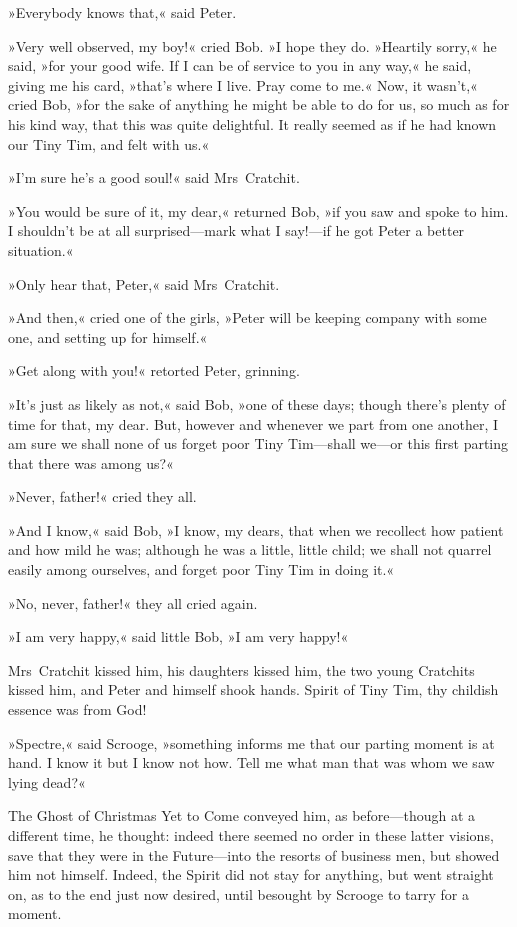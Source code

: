 »Everybody knows that,« said Peter.

»Very well observed, my boy!« cried Bob. »I hope they do. »Heartily sorry,« he said, »for your good wife. If I can be of service to you in any way,« he said, giving me his card, »that's where I live. Pray come to me.« Now, it wasn't,« cried Bob, »for the sake of anything he might be able to do for us, so much as for his kind way, that this was quite delightful. It really seemed as if he had known our Tiny Tim, and felt with us.«

»I'm sure he's a good soul!« said Mrs~Cratchit.

»You would be sure of it, my dear,« returned Bob, »if you saw and spoke to him. I shouldn't be at all surprised---mark what I say!---if he got Peter a better situation.«

»Only hear that, Peter,« said Mrs~Cratchit.

»And then,« cried one of the girls, »Peter will be keeping company with some one, and setting up for himself.«

»Get along with you!« retorted Peter, grinning.

»It's just as likely as not,« said Bob, »one of these days; though there's plenty of time for that, my dear. But, however and when\-ever we part from one another, I am sure we shall none of us forget poor Tiny Tim---shall we---or this first parting that there was among us?«

»Never, father!« cried they all.

»And I know,« said Bob, »I know, my dears, that when we recollect how patient and how mild he was; although he was a little, little child; we shall not quarrel easily among ourselves, and forget poor Tiny Tim in doing it.«

»No, never, father!« they all cried again.

»I am very happy,« said little Bob, »I am very happy!«

Mrs~Cratchit kissed him, his daughters kissed him, the two young Cratchits kissed him, and Peter and himself shook hands. Spirit of Tiny Tim, thy childish essence was from God!

»Spectre,« said Scrooge, »something informs me that our parting moment is at hand. I know it but I know not how. Tell me what man that was whom we saw lying dead?«

The Ghost of Christmas Yet to Come conveyed him, as before---though at a different time, he thought: indeed there seemed no order in these latter visions, save that they were in the Future---into the resorts of business men, but showed him not himself. Indeed, the Spirit did not stay for anything, but went straight on, as to the end just now desired, until besought by Scrooge to tarry for a moment.

